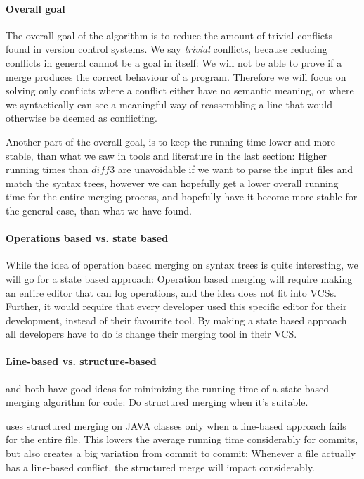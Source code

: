 \documentclass[11pt]{article}
\begin{document}
\paragraph{Overall goal} The overall goal of the algorithm is to reduce the amount of trivial conflicts found in version control systems. We say \textit{trivial} conflicts, because reducing conflicts in general cannot be a goal in itself: We will not be able to prove if a merge produces the correct behaviour of a program. Therefore we will focus on solving only conflicts where a conflict either have no semantic meaning, or where we syntactically can see a meaningful way of reassembling a line that would otherwise be deemed as conflicting.


Another part of the overall goal, is to keep the running time lower and more stable, than what we saw in tools and literature in the last section: Higher running times than $diff3$ are unavoidable if we want to parse the input files and match the syntax trees, however we can hopefully get a lower overall running time for the entire merging process, and hopefully have it become more stable for the general case, than what we have found.

\paragraph{Operations based vs. state based} While the idea of operation based merging on syntax trees is quite interesting, we will go for a state based approach: Operation based merging will require making an entire editor that can log operations, and the idea does not fit into VCSs. Further, it would require that every developer used this specific editor for their development, instead of their favourite tool. By making a state based approach all developers have to do is change their merging tool in their VCS.

\paragraph{Line-based vs. structure-based} \citet{Olav} and \citet{Apel} both have good ideas for minimizing the running time of a state-based merging algorithm for code: Do structured merging when it's suitable.

\citet{Olav} uses structured merging on JAVA classes only when a line-based approach fails for the entire file. This lowers the average running time considerably for commits, but also creates a big variation from commit to commit: Whenever a file actually has a line-based conflict, the structured merge will impact considerably.
\end{document}

